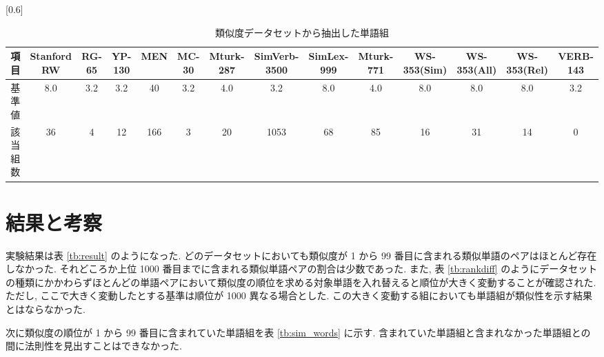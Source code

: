 \documentclass[twocolumn]{jarticle}     %
\begin{document}
\begin{table}[th]
  \centering
  \caption{類似度データセットから抽出した単語組}
  \label{tb:dataset_detail}
  \scalebox{0.6}[0.6]{
		\begin{tabular}{c|ccccccccccccc}
			\hline
			項目   & Stanford RW & RG-65 & YP-130 & MEN & MC-30 & Mturk-287 & SimVerb-3500 & SimLex-999 & Mturk-771 & WS-353(Sim) & WS-353(All) & WS-353(Rel) & VERB-143 \\ \hline
			基準値  & 8.0         & 3.2   & 3.2    & 40  & 3.2   & 4.0       & 3.2          & 8.0        & 4.0       & 8.0         & 8.0         & 8.0         & 3.2      \\
			該当組数 & 36          & 4     & 12     & 166 & 3     & 20        & 1053         & 68         & 85        & 16          & 31          & 14          & 0        \\ \hline
			\end{tabular}
  }
\end{table}

\section{結果と考察}
実験結果は表 \ref{tb:result} のようになった. 
どのデータセットにおいても類似度が 1 から 99 番目に含まれる類似単語のペアはほとんど存在しなかった. 
それどころか上位 1000 番目までに含まれる類似単語ペアの割合は少数であった. 
また, 表 \ref{tb:rankdiff} のようにデータセットの種類にかかわらずほとんどの単語ペアにおいて類似度の順位を求める対象単語を入れ替えると順位が大きく変動することが確認された. 
ただし, ここで大きく変動したとする基準は順位が 1000 異なる場合とした. 
この大きく変動する組においても単語組が類似性を示す結果とはならなかった. 

次に類似度の順位が 1 から 99 番目に含まれていた単語組を表 \ref{tb:sim_words} に示す. 
含まれていた単語組と含まれなかった単語組との間に法則性を見出すことはできなかった. 
\end{document}
